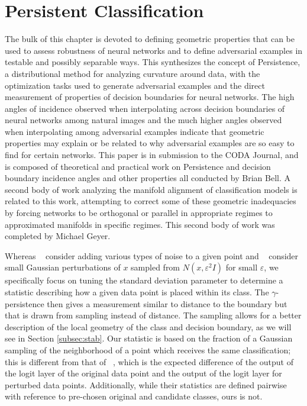 \newcommand{\RR}{I\!\!R} %
\newcommand{\Nat}{I\!\!N} %

\chapter{Persistent Classification}
\label{Chapter3}

The bulk of this chapter is devoted to defining geometric properties
that can be used to assess robustness of neural networks and to
define adversarial examples in testable and possibly separable
ways. This synthesizes the concept of Persistence, a distributional
method for analyzing curvature around data, with the optimization
tasks used to generate adversarial examples and the direct measurement
of properties of decision boundaries for neural networks. The high
angles of incidence observed when interpolating across decision
boundaries of neural networks among natural images and the much higher
angles observed when interpolating among adversarial examples indicate
that geometric properties may explain or be related to why adversarial
examples are so easy to find for certain networks. This paper is in
submission to the CODA Journal, and is composed of theoretical and
practical work on Persistence and decision boundary incidence angles
and other properties all conducted by Brian Bell. A second body of
work analyzing the manifold alignment of classification models is
related to this work, attempting to correct some of these geometric
inadequacies by forcing networks to be orthogonal or parallel in
appropriate regimes to approximated manifolds in specific
regimes. This second body of work was completed by Michael Geyer.

Whereas ~\citet{roth19aodds} consider adding various types of noise to a given point and ~\citet{hosseini2019odds} consider small Gaussian perturbations of $x$ sampled from $N(x,\varepsilon^2 I)$ for small $\varepsilon$, %
we specifically focus on %
tuning the standard deviation parameter to determine a statistic describing how a given data point is placed within its class. The $\gamma$-persistence then gives a measurement similar to distance to the boundary but that is drawn from sampling instead of distance. The sampling allows for a better description of the local geometry of the class and decision boundary, as we will see in Section \ref{subsec:stab}. Our statistic is based on the fraction of a Gaussian sampling of the neighborhood of a point which receives the same classification; this is different from that of ~\citet{roth19aodds}, which is the expected difference of the output of the logit layer of the original data point and the output of the logit layer for perturbed data points.  Additionally, while their statistics are defined pairwise with reference to pre-chosen original and candidate classes, ours is not.

